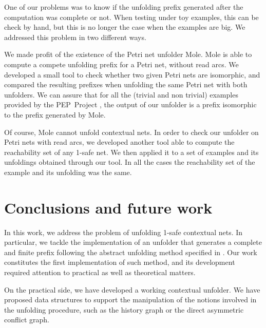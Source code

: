 \documentclass[11pt,a4paper]{article}
\begin{document}
One of our problems was to know if the unfolding prefix generated after the
computation was complete or not.  When testing under toy examples, this can be
check by hand, but this is no longer the case when the examples are big.  We
addressed this problem in two different ways.

We made profit of the existence of the Petri net unfolder Mole.  Mole is able
to compute a compete unfolding prefix for a Petri net, without read arcs.  We
developed a small tool to check whether two given Petri nets are isomorphic,
and compared the resulting prefixes when unfolding the same Petri net with both
unfolders.  We can assure that for all the (trivial and non trivial) examples
provided by the PEP~Project , the output of our unfolder is a prefix
isomorphic to the prefix generated by Mole.

Of course, Mole cannot unfold contextual nets.  In order to check our unfolder
on Petri nets with read arcs, we developed another tool able to compute the
reachability set of any 1-safe net.  We then applied it to a set of examples
and its unfoldings obtained through our tool.  In all the cases the
reachability set of the example and its unfolding was the same.


\section{Conclusions and future work}
\label{sec:conclusions}

In this work, we address the problem of unfolding 1-safe contextual nets.  In
particular, we tackle the implementation of an unfolder that generates a
complete and finite prefix following the abstract unfolding method specified in
.  Our work constitutes the first implementation of such method,
and its development required attention to practical as well as theoretical
matters.

On the practical side, we have developed a working contextual unfolder.  We
have proposed data structures to support the manipulation of the notions
involved in the unfolding procedure, such as the history graph or the direct
asymmetric conflict graph.
\end{document}
